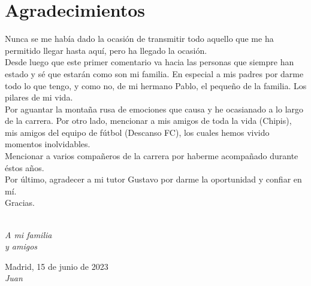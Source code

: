 \cleardoublepage

\chapter*{Agradecimientos}

Nunca se me había dado la ocasión de transmitir todo aquello que me ha permitido llegar hasta aquí, pero ha llegado la ocasión.\\

Desde luego que este primer comentario va hacia las personas que siempre han estado y sé que estarán como son mi familia. En especial a mis padres por darme todo lo que tengo, y como no, de mi hermano Pablo, el pequeño de la familia. Los pilares de mi vida.\\

Por aguantar la montaña rusa de emociones que causa y he ocasianado a lo largo de la carrera. Por otro lado, mencionar a mis amigos de toda la vida (Chipis), mis amigos del equipo de fútbol (Descanso FC), los cuales hemos vivido momentos inolvidables.\\

Mencionar a varios compañeros de la carrera por haberme acompañado durante éstos años.\\

Por último, agradecer a mi tutor Gustavo por darme la oportunidad y confiar en mí.\\

Gracias.\\
\ %


\begin{flushright}
		\vspace{4.0 cm}
		\emph{A mi familia\\
      y amigos}\\
		\par
		\vspace{1.0 cm}
		Madrid, 15 de junio de 2023\\ %
		\emph{Juan}
\end{flushright}

\thispagestyle{empty}

